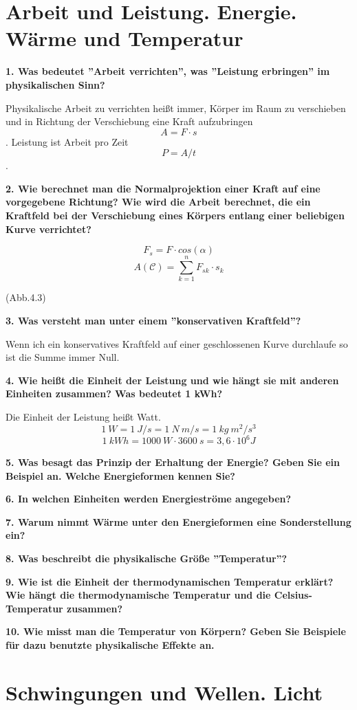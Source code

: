 \documentclass[12pt,a4paper,twoside]{book}
\newcommand{\nqu}[1]{\vspace*{10mm} \noindent \textbf{#1} \par \vspace*{1mm}}
\begin{document}

\chapter{Arbeit und Leistung. Energie. Wärme und Temperatur}

\nqu{1. Was bedeutet ''Arbeit verrichten'', was ''Leistung erbringen'' im physikalischen Sinn?}
Physikalische Arbeit zu verrichten heißt immer, Körper im Raum zu verschieben und in Richtung der Verschiebung eine Kraft aufzubringen \[A=F\cdot s\].
Leistung ist Arbeit pro Zeit \[P=A/t\].

\nqu{2. Wie berechnet man die Normalprojektion einer Kraft auf eine vorgegebene Richtung? Wie wird die Arbeit berechnet, die ein Kraftfeld bei der Verschiebung eines Körpers entlang einer beliebigen Kurve verrichtet?}
\[F_s = F \cdot cos(\alpha)\]
\[A(\mathscr{C})=\sum\limits_{k=1}^n F_{sk} \cdot s_k\]

(Abb.4.3)

\nqu{3. Was versteht man unter einem ''konservativen Kraftfeld''?}
Wenn ich ein konservatives Kraftfeld auf einer geschlossenen Kurve durchlaufe so ist die Summe immer Null.

\nqu{4. Wie heißt die Einheit der Leistung und wie hängt sie mit anderen Einheiten zusammen? Was bedeutet 1 kWh?}
Die Einheit der Leistung heißt Watt.
\[1~W=1~J/s=1~N~m/s=1~kg~m^2/s^3\]
\[1~kWh =1000~W\cdot 3600~s=3,6\cdot 10^6J \]

\nqu{5. Was besagt das Prinzip der Erhaltung der Energie? Geben Sie ein Beispiel an. Welche Energieformen kennen Sie?}

\nqu{6. In welchen Einheiten werden Energieströme angegeben?}

\nqu{7. Warum nimmt Wärme unter den Energieformen eine Sonderstellung ein?}

\nqu{8. Was beschreibt die physikalische Größe ''Temperatur''?}

\nqu{9. Wie ist die Einheit der thermodynamischen Temperatur erklärt? Wie hängt die thermodynamische Temperatur und die Celsius-Temperatur zusammen?}

\nqu{10. Wie misst man die Temperatur von Körpern? Geben Sie Beispiele für dazu benutzte physikalische Effekte an.}


\chapter{Schwingungen und Wellen. Licht}
\end{document}
